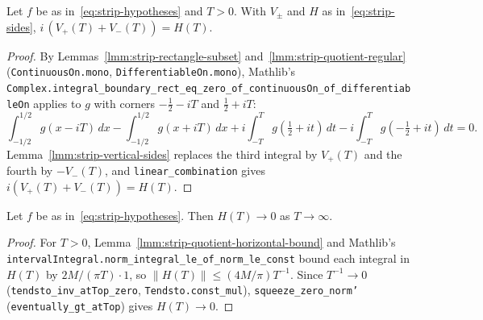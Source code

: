 \begin{lemma}
    \label{lmm:strip-rectangle-identity}
    \leanok
    Let $f$ be as in~\eqref{eq:strip-hypotheses} and $T > 0$. With $V_\pm$ and $H$ as in~\eqref{eq:strip-sides}, $i\,(V_+(T) + V_-(T)) = H(T)$.
\end{lemma}
\begin{proof}
    \leanok
    By Lemmas~\ref{lmm:strip-rectangle-subset} and~\ref{lmm:strip-quotient-regular} (\texttt{ContinuousOn.mono}, \texttt{DifferentiableOn.mono}), Mathlib's \texttt{Complex.integral\_boundary\_rect\_eq\_zero\_of\_continuousOn\_of\_differentiableOn} applies to $g$ with corners $-\tfrac{1}{2} - iT$ and $\tfrac{1}{2} + iT$:
    \[ \int_{-1/2}^{1/2} g(x - iT)\,dx - \int_{-1/2}^{1/2} g(x + iT)\,dx + i\int_{-T}^{T} g(\tfrac{1}{2} + it)\,dt - i\int_{-T}^{T} g(-\tfrac{1}{2} + it)\,dt = 0. \]
    Lemma~\ref{lmm:strip-vertical-sides} replaces the third integral by $V_+(T)$ and the fourth by $-V_-(T)$, and \texttt{linear\_combination} gives $i(V_+(T) + V_-(T)) = H(T)$.
\end{proof}

\begin{lemma}
    \label{lmm:strip-horizontal-vanish}
    \leanok
    Let $f$ be as in~\eqref{eq:strip-hypotheses}. Then $H(T) \to 0$ as $T \to \infty$.
\end{lemma}
\begin{proof}
    \leanok
    For $T > 0$, Lemma~\ref{lmm:strip-quotient-horizontal-bound} and Mathlib's \texttt{intervalIntegral.norm\_integral\_le\_of\_norm\_le\_const} bound each integral in $H(T)$ by $2M/(\pi T) \cdot 1$, so $\|H(T)\| \le (4M/\pi) T^{-1}$. Since $T^{-1} \to 0$ (\texttt{tendsto\_inv\_atTop\_zero}, \texttt{Tendsto.const\_mul}), \texttt{squeeze\_zero\_norm'} (\texttt{eventually\_gt\_atTop}) gives $H(T) \to 0$.
\end{proof}

